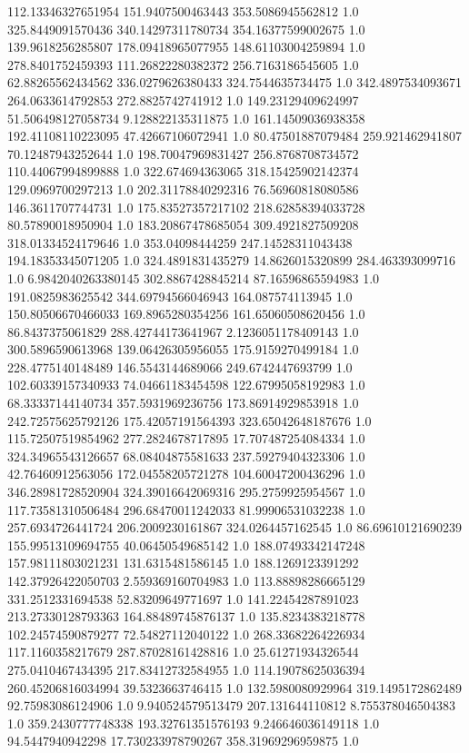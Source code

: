 112.13346327651954	151.9407500463443	353.5086945562812	1.0
325.8449091570436	340.14297311780734	354.16377599002675	1.0
139.9618256285807	178.09418965077955	148.61103004259894	1.0
278.8401752459393	111.26822280382372	256.7163186545605	1.0
62.88265562434562	336.0279626380433	324.7544635734475	1.0
342.4897534093671	264.0633614792853	272.8825742741912	1.0
149.23129409624997	51.506498127058734	9.128822135311875	1.0
161.14509036938358	192.41108110223095	47.42667106072941	1.0
80.47501887079484	259.921462941807	70.12487943252644	1.0
198.70047969831427	256.8768708734572	110.44067994899888	1.0
322.674694363065	318.15425902142374	129.0969700297213	1.0
202.31178840292316	76.56960818080586	146.3611707744731	1.0
175.83527357217102	218.62858394033728	80.57890018950904	1.0
183.20867478685054	309.4921827509208	318.01334524179646	1.0
353.04098444259	247.14528311043438	194.18353345071205	1.0
324.4891831435279	14.8626015320899	284.463393099716	1.0
6.9842040263380145	302.8867428845214	87.16596865594983	1.0
191.0825983625542	344.69794566046943	164.087574113945	1.0
150.80506670466033	169.8965280354256	161.65060508620456	1.0
86.8437375061829	288.42744173641967	2.1236051178409143	1.0
300.5896590613968	139.06426305956055	175.9159270499184	1.0
228.4775140148489	146.5543144689066	249.6742447693799	1.0
102.60339157340933	74.04661183454598	122.67995058192983	1.0
68.33337144140734	357.5931969236756	173.86914929853918	1.0
242.72575625792126	175.42057191564393	323.65042648187676	1.0
115.72507519854962	277.2824678717895	17.707487254084334	1.0
324.34965543126657	68.08404875581633	237.59279404323306	1.0
42.76460912563056	172.04558205721278	104.60047200436296	1.0
346.28981728520904	324.39016642069316	295.2759925954567	1.0
117.73581310506484	296.68470011242033	81.99906531032238	1.0
257.6934726441724	206.2009230161867	324.0264457162545	1.0
86.69610121690239	155.99513109694755	40.06450549685142	1.0
188.07493342147248	157.98111803021231	131.6315481586145	1.0
188.1269123391292	142.37926422050703	2.559369160704983	1.0
113.88898286665129	331.2512331694538	52.83209649771697	1.0
141.22454287891023	213.27330128793363	164.88489745876137	1.0
135.8234383218778	102.24574590879277	72.54827112040122	1.0
268.33682264226934	117.1160358217679	287.87028161428816	1.0
25.61271934326544	275.0410467434395	217.83412732584955	1.0
114.19078625036394	260.45206816034994	39.5323663746415	1.0
132.5980080929964	319.1495172862489	92.75983086124906	1.0
9.940524579513479	207.131644110812	8.755378046504383	1.0
359.2430777748338	193.32761351576193	9.246646036149118	1.0
94.5447940942298	17.730233978790267	358.31969296959875	1.0
